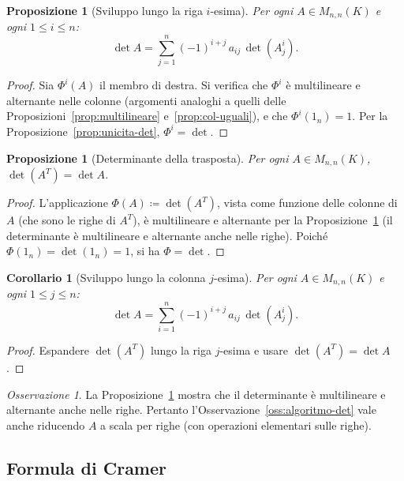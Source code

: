 \documentclass[11pt, a4paper]{book}
\theoremstyle{definition}
\theoremstyle{plain}
\newtheorem{proposizione}[definizione]{Proposizione}
\newtheorem{corollario}[definizione]{Corollario}
\theoremstyle{remark}
\newtheorem{osservazione}[definizione]{Osservazione}
\begin{document}
\begin{proposizione}[Sviluppo lungo la riga $i$-esima]
\label{prop:laplace-righe}
Per ogni $A \in M_{n,n}(K)$ e ogni $1 \leq i \leq n$:
\[
  \det A = \sum_{j=1}^n (-1)^{i+j}\,a_{ij}\,\det(A^i_j).
\]
\end{proposizione}

\begin{proof}
Sia $\Phi^i(A)$ il membro di destra. Si verifica che $\Phi^i$ è multilineare e alternante nelle colonne (argomenti analoghi a quelli delle Proposizioni~\ref{prop:multilineare} e~\ref{prop:col-uguali}), e che $\Phi^i(1_n) = 1$. Per la Proposizione~\ref{prop:unicita-det}, $\Phi^i = \det$.
\end{proof}

\begin{proposizione}[Determinante della trasposta]
\label{prop:det-trasposta}
Per ogni $A \in M_{n,n}(K)$, $\det(A^T) = \det A$.
\end{proposizione}

\begin{proof}
L'applicazione $\Phi(A) \coloneqq \det(A^T)$, vista come funzione delle colonne di $A$ (che sono le righe di $A^T$), è multilineare e alternante per la Proposizione~\ref{prop:laplace-righe} (il determinante è multilineare e alternante anche nelle righe). Poiché $\Phi(1_n) = \det(1_n) = 1$, si ha $\Phi = \det$.
\end{proof}

\begin{corollario}[Sviluppo lungo la colonna $j$-esima]
Per ogni $A \in M_{n,n}(K)$ e ogni $1 \leq j \leq n$:
\[
  \det A = \sum_{i=1}^n (-1)^{i+j}\,a_{ij}\,\det(A^i_j).
\]
\end{corollario}

\begin{proof}
Espandere $\det(A^T)$ lungo la riga $j$-esima e usare $\det(A^T) = \det A$.
\end{proof}

\begin{osservazione}
La Proposizione~\ref{prop:det-trasposta} mostra che il determinante è multilineare e alternante anche nelle righe. Pertanto l'Osservazione~\ref{oss:algoritmo-det} vale anche riducendo $A$ a scala per righe (con operazioni elementari sulle righe).
\end{osservazione}

\subsection{Formula di Cramer}
\end{document}
